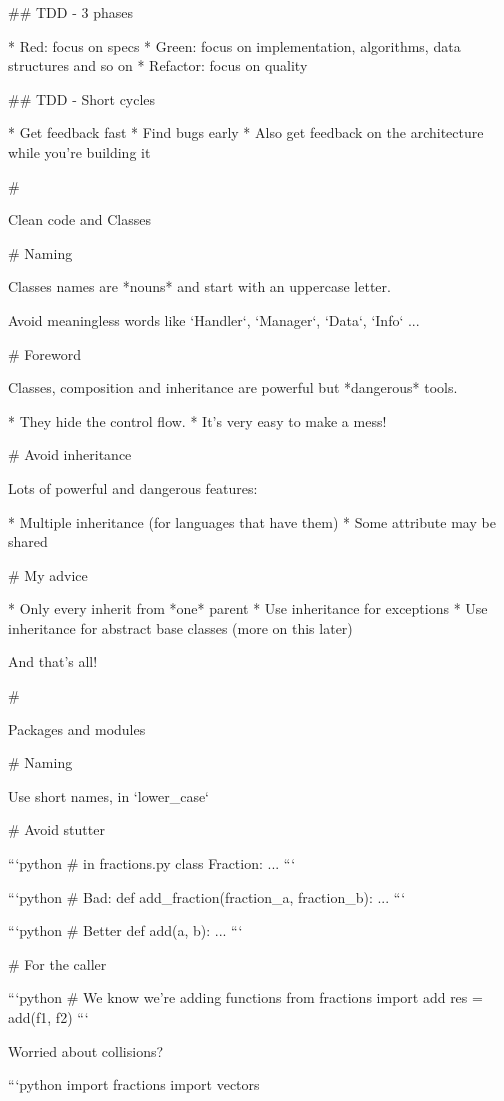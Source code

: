 ## TDD - 3 phases

* Red: focus on specs
* Green: focus on implementation, algorithms, data structures and so on
* Refactor: focus on quality

## TDD - Short cycles

 * Get feedback fast
 * Find bugs early
 * Also get feedback on the architecture while you're building it


#

\huge \center Clean code and Classes

# Naming

Classes names are *nouns* and start with an uppercase letter.

Avoid meaningless words like `Handler`, `Manager`, `Data`, `Info` ...

# Foreword

Classes, composition and inheritance are powerful but *dangerous* tools.

* They hide the control flow.
* It's very easy to make a mess!

# Avoid inheritance

Lots of powerful and dangerous features:

* Multiple inheritance (for languages that have them)
* Some attribute may be shared

#  My advice

* Only every inherit from *one* parent
* Use inheritance for exceptions
* Use inheritance for abstract base classes (more on this later)

\vfill

And that's all!

#

\huge \center Packages and modules

# Naming

Use short names, in `lower_case`


# Avoid stutter

```python
# in fractions.py
class Fraction:
    ...
```

```python
# Bad:
def add_fraction(fraction_a, fraction_b):
    ...
```

```python
# Better
def add(a, b):
    ...
```

# For the caller

```python
# We know we're adding functions
from fractions import add
res = add(f1, f2)
```

\vfill

Worried about collisions?

```python
import fractions
import vectors

